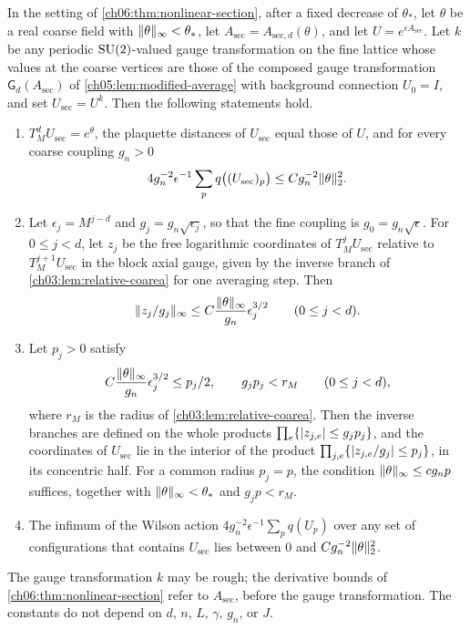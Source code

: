 \begin{corollary}\label{ch06:cor:trial-configuration}
In the setting of \cref{ch06:thm:nonlinear-section}, after a fixed decrease of $\theta_*$, let $\theta$ be a real coarse field with $\lVert \theta\rVert_\infty<\theta_*$, let $A_{\mathrm{sec}}=A_{\mathrm{sec},d}(\theta)$, and let $U=e^{\epsilon A_{\mathrm{sec}}}$. Let $k$ be any periodic $\mathrm{SU}(2)$-valued gauge transformation on the fine lattice whose values at the coarse vertices are those of the composed gauge transformation $\mathsf G_d(A_{\mathrm{sec}})$ of \cref{ch05:lem:modified-average} with background connection $U_0=I$, and set $U_{\mathrm{sec}}=U^k$. Then the following statements hold.
\begin{enumerate}
\item $T_M^dU_{\mathrm{sec}}=e^\theta$, the plaquette distances of $U_{\mathrm{sec}}$ equal those of $U$, and for every coarse coupling $g_n>0$
\[
 4g_n^{-2}\epsilon^{-1}\sum_pq\bigl((U_{\mathrm{sec}})_p\bigr)\le Cg_n^{-2}\lVert \theta\rVert_2^2.
\]
\item Let $\epsilon_j=M^{j-d}$ and $g_j=g_n\sqrt{\epsilon_j}$, so that the fine coupling is $g_0=g_n\sqrt\epsilon$. For $0\le j<d$, let $z_j$ be the free logarithmic coordinates of $T_M^jU_{\mathrm{sec}}$ relative to $T_M^{j+1}U_{\mathrm{sec}}$ in the block axial gauge, given by the inverse branch of \cref{ch03:lem:relative-coarea} for one averaging step. Then
\[
 \lVert z_j/g_j\rVert_\infty\le C\frac{\lVert \theta\rVert_\infty}{g_n}\epsilon_j^{3/2}\qquad(0\le j<d).
\]
\item Let $p_j>0$ satisfy
\[
 C\frac{\lVert \theta\rVert_\infty}{g_n}\epsilon_j^{3/2}\le p_j/2,\qquad g_jp_j<r_M\qquad(0\le j<d),
\]
where $r_M$ is the radius of \cref{ch03:lem:relative-coarea}. Then the inverse branches are defined on the whole products $\prod_e\{\lvert z_{j,e}\rvert\le g_jp_j\}$, and the coordinates of $U_{\mathrm{sec}}$ lie in the interior of the product $\prod_{j,e}\{\lvert z_{j,e}/g_j\rvert\le p_j\}$, in its concentric half. For a common radius $p_j=p$, the condition $\lVert \theta\rVert_\infty\le cg_np$ suffices, together with $\lVert \theta\rVert_\infty<\theta_*$ and $g_jp<r_M$.
\item The infimum of the Wilson action $4g_n^{-2}\epsilon^{-1}\sum_pq(U_p)$ over any set of configurations that contains $U_{\mathrm{sec}}$ lies between $0$ and $Cg_n^{-2}\lVert \theta\rVert_2^2$.
\end{enumerate}
The gauge transformation $k$ may be rough; the derivative bounds of \cref{ch06:thm:nonlinear-section} refer to $A_{\mathrm{sec}}$, before the gauge transformation. The constants do not depend on $d$, $n$, $L$, $\gamma$, $g_n$, or $J$.
\end{corollary}

